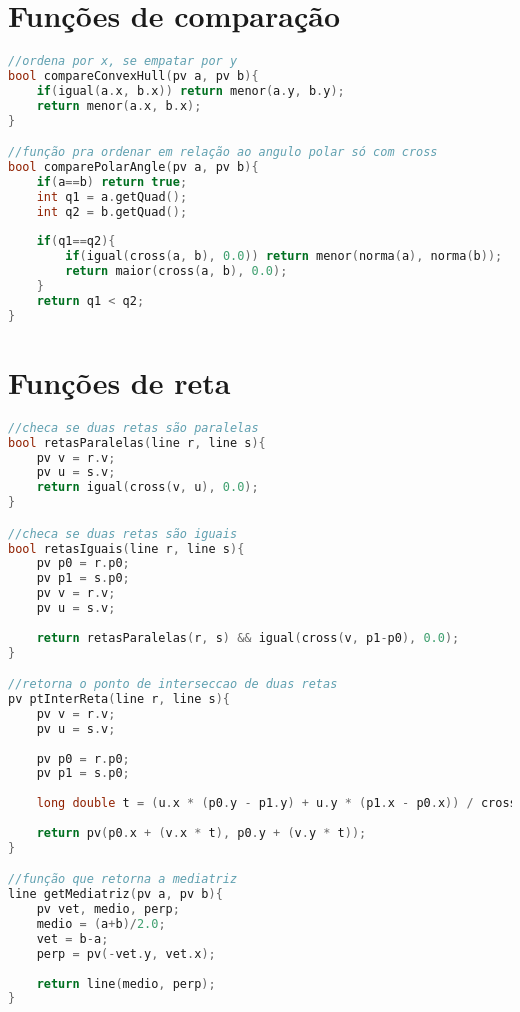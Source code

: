 \documentclass[12pt,a4paper, twoside]{report}
\begin{document}
\section{Funções de comparação}
\noindent\begin{lstlisting}[caption=Funções de comparação,language=C++]
//ordena por x, se empatar por y     
bool compareConvexHull(pv a, pv b){
    if(igual(a.x, b.x)) return menor(a.y, b.y);
    return menor(a.x, b.x);
}

//função pra ordenar em relação ao angulo polar só com cross 
bool comparePolarAngle(pv a, pv b){
    if(a==b) return true;
    int q1 = a.getQuad();
    int q2 = b.getQuad();
    
    if(q1==q2){
        if(igual(cross(a, b), 0.0)) return menor(norma(a), norma(b));
        return maior(cross(a, b), 0.0);
    }
    return q1 < q2;
}
\end{lstlisting}

\section{Funções de reta}
\noindent\begin{lstlisting}[caption=Funções de reta,language=C++]
//checa se duas retas são paralelas       
bool retasParalelas(line r, line s){
    pv v = r.v;
    pv u = s.v;
    return igual(cross(v, u), 0.0);
}

//checa se duas retas são iguais      
bool retasIguais(line r, line s){
    pv p0 = r.p0;
    pv p1 = s.p0;
    pv v = r.v;
    pv u = s.v;
    
    return retasParalelas(r, s) && igual(cross(v, p1-p0), 0.0);
}

//retorna o ponto de interseccao de duas retas   
pv ptInterReta(line r, line s){
    pv v = r.v;
    pv u = s.v;
    
    pv p0 = r.p0;
    pv p1 = s.p0;
    
    long double t = (u.x * (p0.y - p1.y) + u.y * (p1.x - p0.x)) / cross(v, u);
    
    return pv(p0.x + (v.x * t), p0.y + (v.y * t));
}

//função que retorna a mediatriz 
line getMediatriz(pv a, pv b){
    pv vet, medio, perp;
    medio = (a+b)/2.0;
    vet = b-a;
    perp = pv(-vet.y, vet.x);
    
    return line(medio, perp);
}
\end{lstlisting}
\end{document}
